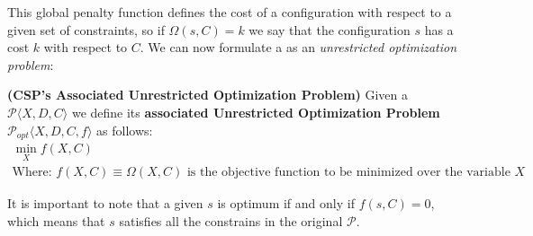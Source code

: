This global penalty function defines the cost of a configuration with respect to a given set of constraints, so if $\Omega\left(s,C\right)=k$ we say that the configuration $s$ has a cost $k$ with respect to $C$. We can now formulate a \CSP{} as an {\it unrestricted optimization problem}:

\begin{definition}{\bf (CSP's Associated Unrestricted Optimization Problem)}
\label{def:ass_CSP}
Given a {\bf \csp} $\mathcal{P}\langle X,D,C \rangle$ we define its {\bf associated Unrestricted Optimization Problem} $\mathcal{P}_{opt}\langle X,D,C,f \rangle$ as follows: 
\begin{equation*}
\begin{array}{l}
\displaystyle\min_{X} f\left(X,C\right)\\
\text{Where:  } f\left(X,C\right) \equiv \Omega\left(X,C\right) \text{ is the objective function to be minimized over the variable } X
\end{array}
\end{equation*}
\end{definition}

It is important to note that a given $s$ is optimum if and only if $f\left(s,C\right) = 0$, which means that $s$ satisfies all the constrains in the original \csp{} $\mathcal{P}$.

